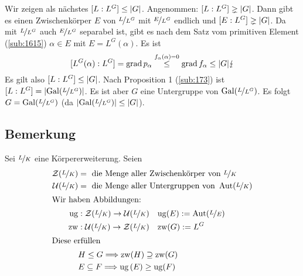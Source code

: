 Wir zeigen als nächstes $[L:L^G] \le \lvert G\rvert $. Angenommen: $[L:L^G] \gneq \lvert G\rvert $. Dann gibt es einen Zwischenkörper $E$ von $\nicefrac{L}{L^G}$ mit $\nicefrac{E}{L^G}$
endlich und $[E:L^G] \gneq \lvert G\rvert $. Da mit $\nicefrac{L}{L^G}$ auch $\nicefrac{E}{L^G}$ separabel ist, gibt es nach dem Satz vom primitiven Element (\ref{sub:1615}) 
$\alpha \in E$ mit $E=L^G(\alpha)$. Es ist 
\[
	[L^G(\alpha): L^G]= \operatorname{grad} p_\alpha \stackrel{f_\alpha(\alpha)=0}{\le} \operatorname{grad} f_\alpha \le \lvert G\rvert \lightning 
\]
Es gilt also $[L:L^G] \le \lvert G\rvert $. Nach Proposition 1 (\ref{sub:173}) ist $[L:L^G]= \lvert\operatorname{Gal}(\nicefrac{L}{L^G})\rvert$. Es ist aber $G$ eine Untergruppe von $\operatorname{Gal}(\nicefrac{L}{L^G})$. Es folgt $G=\operatorname{Gal}(\nicefrac{L}{L^G})$ (da $\lvert\operatorname{Gal}(\nicefrac{L}{L^G})\rvert \le \lvert G\rvert  $). \bewende

\subsection[Bemerkung zur Übersetzung zwischen Zwischenkörpern und Untergruppen von $\Aut(\nicefrac{L}{K})$]{Bemerkung} %
\label{sub:177}
Sei $\nicefrac{L}{K}$ eine Körpererweiterung. Seien 
\begin{align*}
	\mathcal{Z}(\nicefrac{L}{K}) &= \text{ die Menge aller Zwischenkörper von } \nicefrac{L}{K} \\
	\mathcal{U}(\nicefrac{L}{K}) &= \text{ die Menge aller Untergruppen von } \operatorname{Aut}(\nicefrac{L}{K}) \\
	\intertext{Wir haben Abbildungen:}
	\mathrm{ug} &: \mathcal{Z}(\nicefrac{L}{K}) \to \mathcal{U}(\nicefrac{L}{K}) \quad \mathrm{ug}(E) := \operatorname{Aut}(\nicefrac{L}{E}) \\
	\mathrm{zw} &: \mathcal{U}(\nicefrac{L}{K}) \to \mathcal{Z}(\nicefrac{L}{K}) \quad \mathrm{zw}(G) := L^G \\
	\intertext{Diese erfüllen}
	&H \le G \Longrightarrow \mathrm{zw}(H) \supseteq \mathrm{zw}(G) \\
	&E \subseteq F \Longrightarrow \mathrm{ug}\,(E) \ge \mathrm{ug}(F)
\end{align*}

